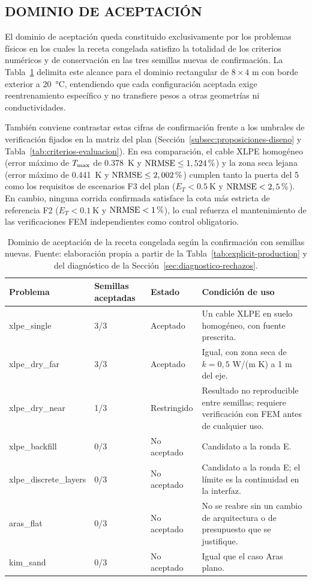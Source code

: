\subsection{DOMINIO DE ACEPTACIÓN}
\label{sec:dominio-validez}

El dominio de aceptación queda constituido exclusivamente por los problemas físicos en los cuales la receta congelada satisfizo la totalidad de los criterios numéricos y de conservación en las tres semillas nuevas de confirmación. La Tabla~\ref{tab:dominio-aceptacion} delimita este alcance para el dominio rectangular de $8\times4$ m con borde exterior a \SI{20}{\celsius}, entendiendo que cada configuración aceptada exige reentrenamiento específico y no transfiere pesos a otras geometrías ni conductividades.

También conviene contrastar estas cifras de confirmación frente a los umbrales de verificación fijados en la matriz del plan (Sección~\ref{subsec:proposiciones-diseno} y Tabla~\ref{tab:criterios-evaluacion}). En esa comparación, el cable XLPE homogéneo (error máximo de $T_{\max}$ de \SI{0,378}{\kelvin} y $\mathrm{NRMSE}\leq 1,524\,\pct{}$) y la zona seca lejana (error máximo de \SI{0,441}{\kelvin} y $\mathrm{NRMSE}\leq 2,002\,\pct{}$) cumplen tanto la puerta del 5\,\pct{} como los requisitos de escenarios F3 del plan ($E_T<\SI{0,5}{\kelvin}$ y $\mathrm{NRMSE}<2,5\,\pct{}$). En cambio, ninguna corrida confirmada satisface la cota más estricta de referencia F2 ($E_T<\SI{0,1}{\kelvin}$ y $\mathrm{NRMSE}<1\,\pct{}$), lo cual refuerza el mantenimiento de las verificaciones FEM independientes como control obligatorio.

\begin{table}[htbp]
\centering
\caption{Dominio de aceptación de la receta congelada según la confirmación con semillas nuevas. Fuente: elaboración propia a partir de la Tabla~\ref{tab:explicit-production} y del diagnóstico de la Sección~\ref{sec:diagnostico-rechazos}.}
\label{tab:dominio-aceptacion}
\begin{tabularx}{\textwidth}{L{3.4cm}C{1.5cm}L{2.6cm}Y}
\toprule
Problema & Semillas aceptadas & Estado & Condición de uso \\
\midrule
xlpe\_single & 3/3 & Aceptado & Un cable XLPE en suelo homogéneo, con fuente prescrita. \\
xlpe\_dry\_far & 3/3 & Aceptado & Igual, con zona seca de $k=0,5$ W/(m K) a 1 m del eje. \\
xlpe\_dry\_near & 1/3 & Restringido & Resultado no reproducible entre semillas; requiere verificación con FEM antes de cualquier uso. \\
xlpe\_backfill & 0/3 & No aceptado & Candidato a la ronda E. \\
xlpe\_discrete\_layers & 0/3 & No aceptado & Candidato a la ronda E; el límite es la continuidad en la interfaz. \\
aras\_flat & 0/3 & No aceptado & No se reabre sin un cambio de arquitectura o de presupuesto que se justifique. \\
kim\_sand & 0/3 & No aceptado & Igual que el caso Aras plano. \\
\bottomrule
\end{tabularx}
\end{table}

